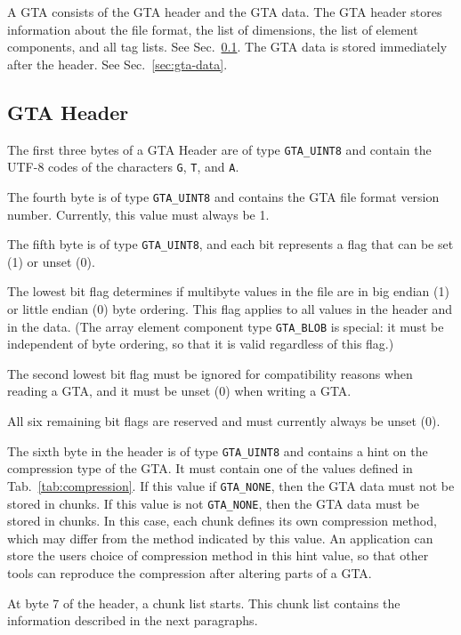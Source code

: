 \documentclass[a4paper,11pt]{article}
\newcommand{\code}[1]{\texttt{#1}}
\begin{document}
A GTA consists of the GTA header and the GTA data. The GTA header stores
information about the file format, the list of dimensions, the list of element
components, and all tag lists. See Sec.~\ref{sec:gta-header}.
The GTA data is stored immediately after the header. See Sec.~\ref{sec:gta-data}.


\subsection{GTA Header}
\label{sec:gta-header}

The first three bytes of a GTA Header are of type \code{GTA\_UINT8} and contain
the \mbox{UTF-8} codes of the characters \code{G}, \code{T}, and \code{A}.

The fourth byte is of type \code{GTA\_UINT8} and contains the GTA file format
version number. Currently, this value must always be 1.

The fifth byte is of type \code{GTA\_UINT8}, and each bit represents a flag that
can be set (1) or unset (0).

The lowest bit flag determines if multibyte values in the file are in big endian
(1) or little endian (0) byte ordering. This flag applies to all values in the
header and in the data. (The array element component type \code{GTA\_BLOB} is special:
it must be independent of byte ordering, so that it is valid regardless of this
flag.)

The second lowest bit flag must be ignored for compatibility reasons when
reading a GTA, and it must be unset (0) when writing a GTA.

All six remaining bit flags are reserved and must currently always be unset (0).

The sixth byte in the header is of type \code{GTA\_UINT8} and contains a hint on
the compression type of the GTA. It must contain one of the values defined in
Tab.~\ref{tab:compression}.
If this value if \code{GTA\_NONE}, then the GTA data must not be stored in chunks.
If this value is not \code{GTA\_NONE}, then the GTA data must be stored in
chunks. In this case, each chunk defines its own compression method, which may
differ from the method indicated by this value.
An application can store the users choice of compression method in this hint
value, so that other tools can reproduce the compression after altering parts of
a GTA.

At byte 7 of the header, a chunk list starts. This chunk list contains the
information described in the next paragraphs.
\end{document}
